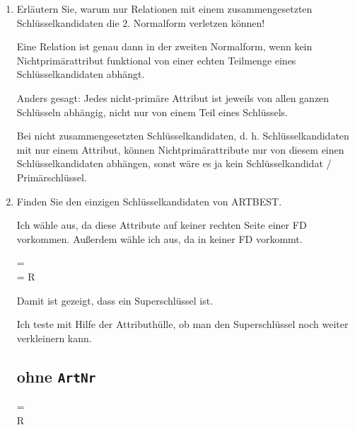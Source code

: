 \documentclass{bschlangaul-aufgabe}
\begin{document}
\begin{enumerate}


\item Erläutern Sie, warum nur Relationen mit einem zusammengesetzten
Schlüsselkandidaten die 2. Normalform verletzen
können!

\begin{bAntwort}
Eine Relation ist genau dann in der zweiten Normalform, wenn kein
Nichtprimärattribut funktional von einer echten Teilmenge eines
Schlüsselkandidaten abhängt.

Anders gesagt: Jedes nicht-primäre Attribut ist jeweils von
allen ganzen Schlüsseln abhängig, nicht nur von einem Teil
eines Schlüssels.

Bei nicht zusammengesetzten Schlüsselkandidaten, d. h.
Schlüsselkandidaten mit nur einem Attribut, können Nichtprimärattribute
nur von diesem einen Schlüsselkandidaten abhängen,
sonst wäre es ja kein Schlüsselkandidat / Primär\-schlüssel.
\end{bAntwort}


\item Finden Sie den einzigen
Schlüsselkandidaten von ARTBEST.

\begin{bAntwort}
Ich wähle  aus, da diese Attribute auf
keiner rechten Seite einer FD vorkommen. Außerdem wähle ich 
aus, da  in keiner FD vorkommt.

\begin{liAHuelle}
 = \\
 = R
\end{liAHuelle}

Damit ist gezeigt, dass  ein
Superschlüssel ist.

Ich teste mit Hilfe der Attributhülle, ob man den Superschlüssel noch
weiter verkleinern kann.

\subsection*{ohne \texttt{ArtNr}}

\begin{liAHuelle}
 = \\
 \neq R
\end{liAHuelle}

\end{bAntwort}
\end{enumerate}
\end{document}
